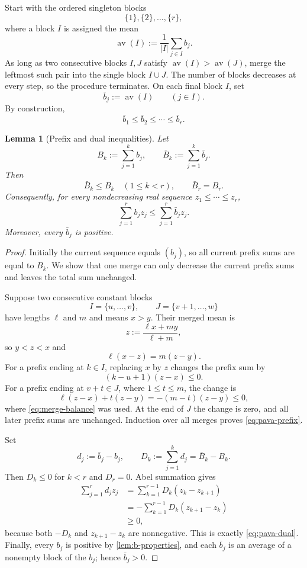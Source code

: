 \documentclass[11pt]{article}
\newtheorem{lemma}[lemma]{Lemma}
\numberwithin{equation}{section}
\begin{document}
Start with the ordered singleton blocks
\[
 \{1\},\{2\},\dots,\{r\},
\]
where a block $I$ is assigned the mean
\[
 \operatorname{av}(I):=\frac{1}{|I|}\sum_{j\in I}b_j.
\]
As long as two consecutive blocks $I,J$ satisfy
$\operatorname{av}(I)>\operatorname{av}(J)$, merge the leftmost such pair
into the single block $I\cup J$.  The number of blocks decreases at every
step, so the procedure terminates.  On each final block $I$, set
\begin{equation}
 \bar b_j:=\operatorname{av}(I)
 \qquad(j\in I).\label{eq:def-bar-b}
\end{equation}
By construction,
\[
 \bar b_1\leq\bar b_2\leq\cdots\leq\bar b_r.
\]

\begin{lemma}[Prefix and dual inequalities]\label{lem:pava}
Let
\[
 B_k:=\sum_{j=1}^k b_j,
 \qquad
 \bar B_k:=\sum_{j=1}^k\bar b_j.
\]
Then
\begin{equation}
 \bar B_k\leq B_k
 \quad(1\leq k<r),
 \qquad
 \bar B_r=B_r.\label{eq:pava-prefix}
\end{equation}
Consequently, for every nondecreasing real sequence
$z_1\leq\cdots\leq z_r$,
\begin{equation}
 \sum_{j=1}^r b_jz_j
 \leq
 \sum_{j=1}^r\bar b_jz_j.\label{eq:pava-dual}
\end{equation}
Moreover, every $\bar b_j$ is positive.
\end{lemma}

\begin{proof}
Initially the current sequence equals $(b_j)$, so all current prefix sums
are equal to $B_k$.  We show that one merge can only decrease the current
prefix sums and leaves the total sum unchanged.

Suppose two consecutive constant blocks
\[
 I=\{u,\dots,v\},
 \qquad
 J=\{v+1,\dots,w\}
\]
have lengths $\ell$ and $m$ and means $x>y$.  Their merged mean is
\[
 z:=\frac{\ell x+my}{\ell+m},
\]
so $y<z<x$ and
\begin{equation}
 \ell(x-z)=m(z-y).\label{eq:merge-balance}
\end{equation}
For a prefix ending at $k\in I$, replacing $x$ by $z$ changes the prefix
sum by
\[
 (k-u+1)(z-x)\leq0.
\]
For a prefix ending at $v+t\in J$, where $1\leq t\leq m$, the change is
\[
 \ell(z-x)+t(z-y)
 =-(m-t)(z-y)
 \leq0,
\]
where \eqref{eq:merge-balance} was used.  At the end of $J$ the change is
zero, and all later prefix sums are unchanged.  Induction over all merges
proves \eqref{eq:pava-prefix}.

Set
\[
 d_j:=\bar b_j-b_j,
 \qquad
 D_k:=\sum_{j=1}^k d_j=\bar B_k-B_k.
\]
Then $D_k\leq0$ for $k<r$ and $D_r=0$.  Abel summation gives
\[
 \begin{aligned}
 \sum_{j=1}^r d_jz_j
 &=\sum_{k=1}^{r-1}D_k(z_k-z_{k+1})\\
 &=-\sum_{k=1}^{r-1}D_k(z_{k+1}-z_k)\\
 &\geq0,
 \end{aligned}
\]
because both $-D_k$ and $z_{k+1}-z_k$ are nonnegative.  This is exactly
\eqref{eq:pava-dual}.  Finally, every $b_j$ is positive by
\cref{lem:b-properties}, and each $\bar b_j$ is an average of a nonempty
block of the $b_j$; hence $\bar b_j>0$.
\end{proof}
\end{document}
